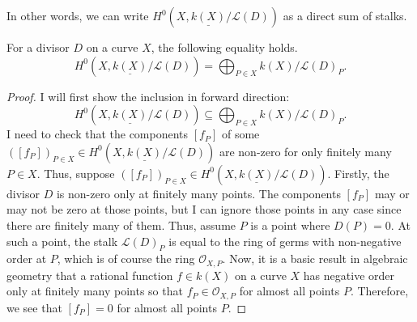 In other words, we can write $H^{0}(X,\underline{k(X)}/\mathcal{L}(D))$ as a
direct sum of stalks.
\begin{lemm}
  For a divisor $D$ on a curve $X$, the following equality holds.
  \[
    H^{0}(X,\underline{k(X)}/\mathcal{L}(D))=\bigoplus_{P\in X}
    k(X)/\mathcal{L}(D)_{P}.
  \]
\end{lemm}
\begin{proof}
  I will first show the inclusion in forward direction:
  \[
    H^{0}(X,\underline{k(X)}/\mathcal{L}(D))\subseteq\bigoplus_{P\in X}
    k(X)/\mathcal{L}(D)_{P}.
  \]
  I need to check that the components $[f_{P}]$ of some
  $([f_{P}])_{P\in X}\in H^{0}(X,\underline{k(X)}/\mathcal{L}(D))$ are non-zero
  for only finitely many $P\in X$. Thus, suppose $([f_{P}])_{P\in X}\in
  H^{0}(X,\underline{k(X)}/\mathcal{L}(D))$. Firstly, the divisor $D$ is
  non-zero only at finitely many points. The components $[f_{P}]$ may or may
  not be zero at those points, but I can ignore those points in any case
  since there are finitely many of them. Thus, assume $P$ is a point where
  $D(P)=0$. At such a point, the stalk $\mathcal{L}(D)_{P}$ is equal to the
  ring of germs with non-negative order at $P$, which is of course the ring
  $\mathscr{O}_{X,P}$. Now, it is a basic result in algebraic geometry that
  a rational function $f\in k(X)$ on a curve $X$ has negative order only
  at finitely many points so that $f_{P}\in\mathscr{O}_{X,P}$ for almost
  all points $P$. Therefore, we see that $[f_{P}]=0$ for almost all points
  $P$.


\end{proof}
